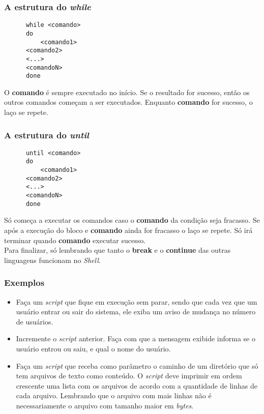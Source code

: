 \documentclass{beamer}
\begin{document}
   \begin{frame}[fragile]
      \frametitle{A estrutura do \textit{while}}
      \begin{verbatim}
      while <comando>
      do
          <comando1>
	  <comando2>
	  <...>
	  <comandoN>
      done
      \end{verbatim}
      O \textbf{comando} é sempre executado no início. Se o resultado for sucesso, então os outros comandos começam a ser executados. Enquanto \textbf{comando} for sucesso, o laço se repete.
\end{frame}

   \begin{frame}[fragile]
      \frametitle{A estrutura do \textit{until}}
      \begin{verbatim}
      until <comando>
      do
          <comando1>
	  <comando2>
	  <...>
	  <comandoN>
      done
      \end{verbatim}
      Só começa a executar os comandos caso o \textbf{comando} da condição seja fracasso. Se após a execução do bloco e \textbf{comando} ainda for fracasso o laço se repete. Só irá terminar quando \textbf{comando} executar sucesso. \\ 
      Para finalizar, só lembrando que tanto o \textbf{break} e o \textbf{continue} das outras linguagens funcionam no \textit{Shell}.
\end{frame}

   \begin{frame}
      \frametitle{Exemplos}
      \begin{itemize}
         \item Faça um \textit{script} que fique em execução sem parar, sendo que cada vez que um usuário entrar ou sair do sistema, ele exiba um aviso de mudança no número de usuários.
	 \item Incremente o \textit{script} anterior. Faça com que a mensagem exibide informa se o usuário entrou ou saiu, e qual o nome do usuário.
	 \item Faça um \textit{script} que receba como parâmetro o caminho de um diretório que só tem arquivos de texto como conteúdo. O \textit{script} deve imprimir em ordem crescente uma lista com os arquivos de acordo com a quantidade de linhas de cada arquivo. Lembrando que o arquivo com mais linhas não é necessariamente o arquivo com tamanho maior em \textit{bytes}.
      \end{itemize}
   \end{frame}
\end{document}
